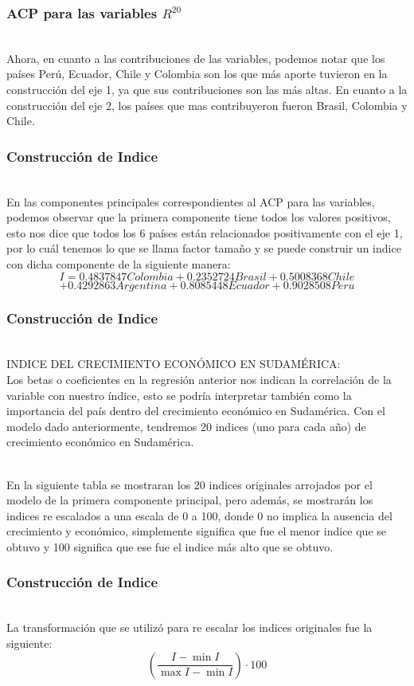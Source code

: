 \documentclass[12pt]{beamer}
\begin{document}
\begin{frame}
\frametitle{ACP para las variables $R^{20}$}
~\\Ahora, en cuanto a las contribuciones de las variables, podemos notar que los países Perú, Ecuador, Chile y Colombia son los que más aporte tuvieron en la construcción del eje 1, ya que sus contribuciones son las más altas. En cuanto a la construcción del eje 2, los países que mas contribuyeron fueron Brasil, Colombia y Chile.
\end{frame}

\begin{frame}
\frametitle{Construcción de Indice}
~\\En las componentes principales correspondientes al ACP para las variables, podemos observar que la primera componente tiene todos los valores positivos, esto nos dice que todos los 6 países están relacionados positivamente con el eje 1, por lo cuál tenemos lo que se llama factor tamaño y se puede construir un indice con dicha componente de la siguiente manera:
$$I=0.4837847 Colombia+0.2352724 Brasil + 0.5008368 Chile$$ 
$$+0.4292863 Argentina+0.8085448 Ecuador+0.9028508 Peru$$
\end{frame}

\begin{frame}
\frametitle{Construcción de Indice}
~\\INDICE DEL CRECIMIENTO ECONÓMICO EN SUDAMÉRICA:
~\\Los betas o coeficientes en la regresión anterior nos indican la correlación de la variable con nuestro índice, esto se podría interpretar también como la importancia del país dentro del crecimiento económico en Sudamérica. Con el modelo dado anteriormente, tendremos 20 indices (uno para cada año) de crecimiento económico en Sudamérica.

~\\En la siguiente tabla se mostraran los 20 indices originales arrojados por el modelo de la primera componente principal, pero además, se mostrarán los indices re escalados a una escala de 0 a 100, donde 0 no implica la ausencia del crecimiento y económico, simplemente significa que fue el menor indice que se obtuvo y 100 significa que ese fue el indice más alto que se obtuvo.
\end{frame}

\begin{frame}
\frametitle{Construcción de Indice}
~\\La transformación que se utilizó para re escalar los indices originales fue la siguiente:
$$\left(\frac{I-\min{I}}{\max{I}-\min{I}}\right)\cdot 100$$
\end{frame}
\end{document}
